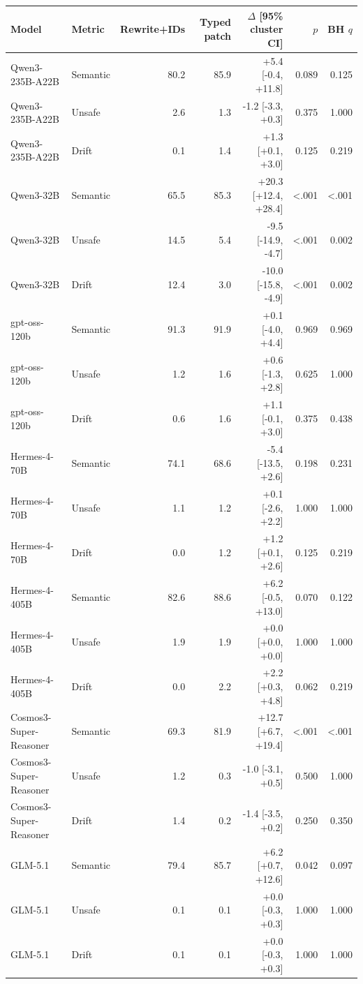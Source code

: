\begin{tabular}{llrrrrr}
\toprule
Model & Metric & Rewrite+IDs & Typed patch & $\Delta$ [95\% cluster CI] & $p$ & BH $q$ \\
\midrule
Qwen3-235B-A22B & Semantic & 80.2 & 85.9 & +5.4 [-0.4, +11.8] & 0.089 & 0.125 \\
Qwen3-235B-A22B & Unsafe & 2.6 & 1.3 & -1.2 [-3.3, +0.3] & 0.375 & 1.000 \\
Qwen3-235B-A22B & Drift & 0.1 & 1.4 & +1.3 [+0.1, +3.0] & 0.125 & 0.219 \\
Qwen3-32B & Semantic & 65.5 & 85.3 & +20.3 [+12.4, +28.4] & <.001 & <.001 \\
Qwen3-32B & Unsafe & 14.5 & 5.4 & -9.5 [-14.9, -4.7] & <.001 & 0.002 \\
Qwen3-32B & Drift & 12.4 & 3.0 & -10.0 [-15.8, -4.9] & <.001 & 0.002 \\
gpt-oss-120b & Semantic & 91.3 & 91.9 & +0.1 [-4.0, +4.4] & 0.969 & 0.969 \\
gpt-oss-120b & Unsafe & 1.2 & 1.6 & +0.6 [-1.3, +2.8] & 0.625 & 1.000 \\
gpt-oss-120b & Drift & 0.6 & 1.6 & +1.1 [-0.1, +3.0] & 0.375 & 0.438 \\
Hermes-4-70B & Semantic & 74.1 & 68.6 & -5.4 [-13.5, +2.6] & 0.198 & 0.231 \\
Hermes-4-70B & Unsafe & 1.1 & 1.2 & +0.1 [-2.6, +2.2] & 1.000 & 1.000 \\
Hermes-4-70B & Drift & 0.0 & 1.2 & +1.2 [+0.1, +2.6] & 0.125 & 0.219 \\
Hermes-4-405B & Semantic & 82.6 & 88.6 & +6.2 [-0.5, +13.0] & 0.070 & 0.122 \\
Hermes-4-405B & Unsafe & 1.9 & 1.9 & +0.0 [+0.0, +0.0] & 1.000 & 1.000 \\
Hermes-4-405B & Drift & 0.0 & 2.2 & +2.2 [+0.3, +4.8] & 0.062 & 0.219 \\
Cosmos3-Super-Reasoner & Semantic & 69.3 & 81.9 & +12.7 [+6.7, +19.4] & <.001 & <.001 \\
Cosmos3-Super-Reasoner & Unsafe & 1.2 & 0.3 & -1.0 [-3.1, +0.5] & 0.500 & 1.000 \\
Cosmos3-Super-Reasoner & Drift & 1.4 & 0.2 & -1.4 [-3.5, +0.2] & 0.250 & 0.350 \\
GLM-5.1 & Semantic & 79.4 & 85.7 & +6.2 [+0.7, +12.6] & 0.042 & 0.097 \\
GLM-5.1 & Unsafe & 0.1 & 0.1 & +0.0 [-0.3, +0.3] & 1.000 & 1.000 \\
GLM-5.1 & Drift & 0.1 & 0.1 & +0.0 [-0.3, +0.3] & 1.000 & 1.000 \\
\bottomrule
\end{tabular}
